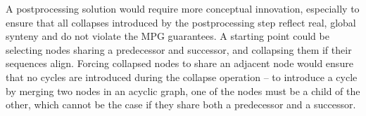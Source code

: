 A postprocessing solution would require more conceptual innovation, especially to ensure that all collapses introduced by the postprocessing step reflect real, global synteny and do not violate the MPG guarantees.
A starting point could be selecting nodes sharing a predecessor and successor, and collapsing them if their sequences align.
Forcing collapsed nodes to share an adjacent node would ensure that no cycles are introduced during the collapse operation -- to introduce a cycle by merging two nodes in an acyclic graph, one of the nodes must be a child of the other, which cannot be the case if they share both a predecessor and a successor. %






